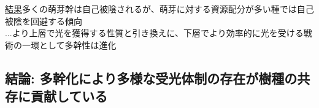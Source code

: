 \documentclass[a0, 36pt, plainboxedsections]{sciposter} %
\begin{document}
\begin{multicols}{2}
\begin{mdframed}[style=conclusion.frame]
{  \underline{結果}多くの萌芽幹は自己被陰されるが、萌芽に対する資源配分が多い種では自己被陰を回避する傾向\\
  ...より上層で光を獲得する性質と引き換えに、下層でより効率的に光を受ける戦術の一環として多幹性は進化
  
  \subsection*{結論: 多幹化により多様な受光体制の存在が樹種の共存に貢献している} %
  }
\end{mdframed}

\end{multicols}

\begin{mdframed}[style=section.frame]
  \centering\huge\textbf{}
\end{mdframed}
\end{document}
